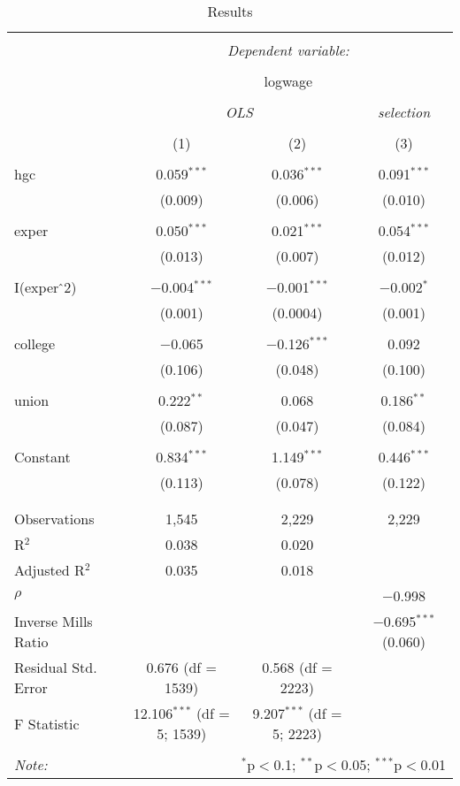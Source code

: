 \documentclass{article}
\begin{document}
\begin{table}[!htbp] \centering 
  \caption{Results} 
  \label{} 
\begin{tabular}{@{\extracolsep{5pt}}lccc} 
\\[-1.8ex]\hline 
\hline \\[-1.8ex] 
 & \multicolumn{3}{c}{\textit{Dependent variable:}} \\ 
\cline{2-4} 
\\[-1.8ex] & \multicolumn{3}{c}{logwage} \\ 
\\[-1.8ex] & \multicolumn{2}{c}{\textit{OLS}} & \textit{selection} \\ 
\\[-1.8ex] & (1) & (2) & (3)\\ 
\hline \\[-1.8ex] 
 hgc & 0.059$^{***}$ & 0.036$^{***}$ & 0.091$^{***}$ \\ 
  & (0.009) & (0.006) & (0.010) \\ 
  & & & \\ 
 exper & 0.050$^{***}$ & 0.021$^{***}$ & 0.054$^{***}$ \\ 
  & (0.013) & (0.007) & (0.012) \\ 
  & & & \\ 
 I(exper$\hat{\mkern6mu}$2) & $-$0.004$^{***}$ & $-$0.001$^{***}$ & $-$0.002$^{*}$ \\ 
  & (0.001) & (0.0004) & (0.001) \\ 
  & & & \\ 
 college & $-$0.065 & $-$0.126$^{***}$ & 0.092 \\ 
  & (0.106) & (0.048) & (0.100) \\ 
  & & & \\ 
 union & 0.222$^{**}$ & 0.068 & 0.186$^{**}$ \\ 
  & (0.087) & (0.047) & (0.084) \\ 
  & & & \\ 
 Constant & 0.834$^{***}$ & 1.149$^{***}$ & 0.446$^{***}$ \\ 
  & (0.113) & (0.078) & (0.122) \\ 
  & & & \\ 
\hline \\[-1.8ex] 
Observations & 1,545 & 2,229 & 2,229 \\ 
R$^{2}$ & 0.038 & 0.020 &  \\ 
Adjusted R$^{2}$ & 0.035 & 0.018 &  \\ 
$\rho$ &  &  & $-$0.998 \\ 
Inverse Mills Ratio &  &  & $-$0.695$^{***}$  (0.060) \\ 
Residual Std. Error & 0.676 (df = 1539) & 0.568 (df = 2223) &  \\ 
F Statistic & 12.106$^{***}$ (df = 5; 1539) & 9.207$^{***}$ (df = 5; 2223) &  \\ 
\hline 
\hline \\[-1.8ex] 
\textit{Note:}  & \multicolumn{3}{r}{$^{*}$p$<$0.1; $^{**}$p$<$0.05; $^{***}$p$<$0.01} \\ 
\end{tabular} 
\end{table} 
\end{document}
